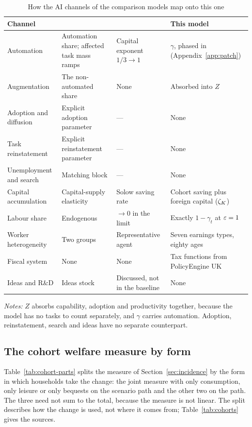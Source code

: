 \begin{table}[htbp]
\centering
\caption{How the AI channels of the comparison models map onto this one}
\label{tab:channels}
\small
\begin{tabular}{p{3.2cm}p{3.6cm}p{2.8cm}p{3.4cm}}
\toprule
Channel & \citet{korinek2026} & \citet{mollimas2026} & This model \\
\midrule
Automation & Automation share; affected task mass ramps & Capital exponent $1/3 \to 1$ & $\gamma$, phased in (Appendix~\ref{app:patch}) \\
Augmentation & The non-automated share & None & Absorbed into $Z$ \\
Adoption and diffusion & Explicit adoption parameter & --- & None \\
Task reinstatement & Explicit reinstatement parameter & --- & None \\
Unemployment and search & Matching block & --- & None \\
Capital accumulation & Capital-supply elasticity & Solow saving rate & Cohort saving plus foreign capital ($\zeta_K$) \\
Labour share & Endogenous & $\to 0$ in the limit & Exactly $1-\gamma_t$ at $\varepsilon = 1{}$ \\
Worker heterogeneity & Two groups & Representative agent & Seven earnings types, eighty ages \\
Fiscal system & None & None & Tax functions from PolicyEngine UK \\
Ideas and R\&D & Ideas stock & Discussed, not in the baseline & None \\
\bottomrule
\end{tabular}
\par\medskip
\begin{minipage}{0.92\textwidth}
\footnotesize \emph{Notes:} $Z$ absorbs capability, adoption and productivity together, because the model has no tasks to count separately, and $\gamma$ carries automation. Adoption, reinstatement, search and ideas have no separate counterpart.
\end{minipage}
\end{table}

\subsection{The cohort welfare measure by form}
\label{app:cohort-parts}

Table~\ref{tab:cohort-parts} splits the measure of Section~\ref{sec:incidence} by the form in which households take the change: the joint measure with only consumption, only leisure or only bequests on the scenario path and the other two on the path. The three need not sum to the total, because the measure is not linear. The split describes how the change is used, not where it comes from; Table~\ref{tab:cohorts} gives the sources.

